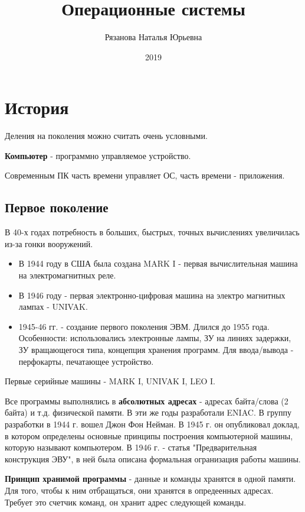 \documentclass[a4paper, 14pt]{report}
\author{Рязанова Наталья Юрьевна}
\title{Операционные системы}
\date{2019}
\begin{document}
\maketitle

\tableofcontents
\clearpage

\chapter{История}

Деления на поколения можно считать очень условными.

\textbf{Компьютер} - программно управляемое устройство.

Современным ПК часть времени управляет ОС, часть времени - приложения.

\section{Первое поколение}

В 40-х годах потребность в больших, быстрых, точных вычислениях увеличилась из-за гонки вооружений.

\begin{itemize}

    \item В 1944 году в США была создана MARK I - первая вычислительная машина на электромагнитных реле.

    \item В 1946 году - первая электронно-цифровая машина на электро магнитных лампах - UNIVAK.

    \item 1945-46 гг. - создание первого поколения ЭВМ. Длился до 1955 года. Особенности: использовались электронные лампы, ЗУ на линиях задержки, ЗУ вращающегося типа, концепция хранения программ. Для ввода/вывода - перфокарты, печатающее устройство.
\end{itemize}

Первые серийные машины - MARK I, UNIVAK I, LEO I.

Все программы выполнялись в \textbf{абсолютных адресах} - адресах байта/слова (2 байта) и т.д. физической памяти. В эти же годы разработали ENIAC. В группу разработки в 1944 г. вошел Джон Фон Нейман. В 1945 г. он опубликовал доклад, в котором определены основные принципы построения компьютерной машины, которую называют компьютером. В 1946 г. - статья "Предварительная конструкция ЭВУ", в ней была описана формальная огранизация работы машины.

\textbf{Принцип хранимой программы} - данные и команды хранятся в одной памяти. Для того, чтобы к ним отбращаться, они хранятся в опредеенных адресах. Требует это счетчик команд, он хранит адрес следующей команды.
\end{document}
